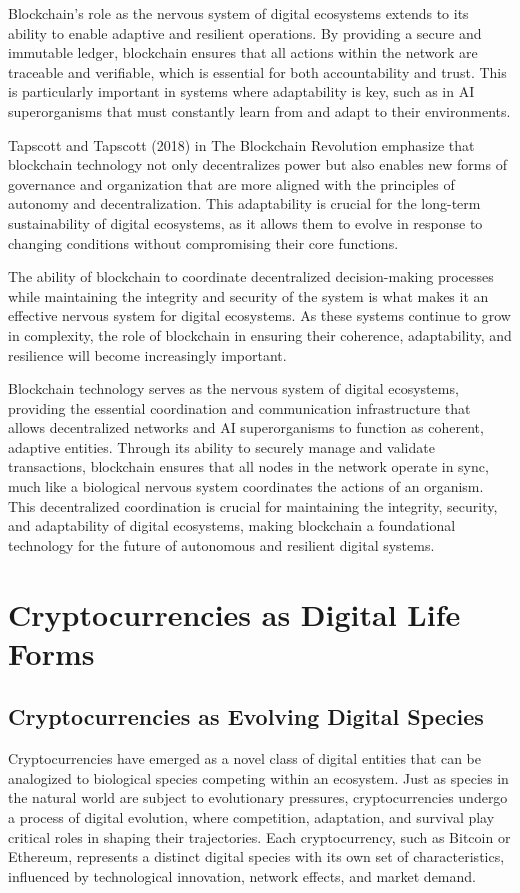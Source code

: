 \documentclass[12pt,twoside]{article}
\begin{document}
Blockchain’s role as the nervous system of digital ecosystems extends to its ability to enable adaptive and resilient operations. By providing a secure and immutable ledger, blockchain ensures that all actions within the network are traceable and verifiable, which is essential for both accountability and trust. This is particularly important in systems where adaptability is key, such as in AI superorganisms that must constantly learn from and adapt to their environments.

Tapscott and Tapscott (2018) in The Blockchain Revolution emphasize that blockchain technology not only decentralizes power but also enables new forms of governance and organization that are more aligned with the principles of autonomy and decentralization. This adaptability is crucial for the long-term sustainability of digital ecosystems, as it allows them to evolve in response to changing conditions without compromising their core functions.

The ability of blockchain to coordinate decentralized decision-making processes while maintaining the integrity and security of the system is what makes it an effective nervous system for digital ecosystems. As these systems continue to grow in complexity, the role of blockchain in ensuring their coherence, adaptability, and resilience will become increasingly important.

Blockchain technology serves as the nervous system of digital ecosystems, providing the essential coordination and communication infrastructure that allows decentralized networks and AI superorganisms to function as coherent, adaptive entities. Through its ability to securely manage and validate transactions, blockchain ensures that all nodes in the network operate in sync, much like a biological nervous system coordinates the actions of an organism. This decentralized coordination is crucial for maintaining the integrity, security, and adaptability of digital ecosystems, making blockchain a foundational technology for the future of autonomous and resilient digital systems.


\section{Cryptocurrencies as Digital Life Forms}

\subsection{Cryptocurrencies as Evolving Digital Species}
Cryptocurrencies have emerged as a novel class of digital entities that can be analogized to biological species competing within an ecosystem. Just as species in the natural world are subject to evolutionary pressures, cryptocurrencies undergo a process of digital evolution, where competition, adaptation, and survival play critical roles in shaping their trajectories. Each cryptocurrency, such as Bitcoin or Ethereum, represents a distinct digital species with its own set of characteristics, influenced by technological innovation, network effects, and market demand.
\end{document}
